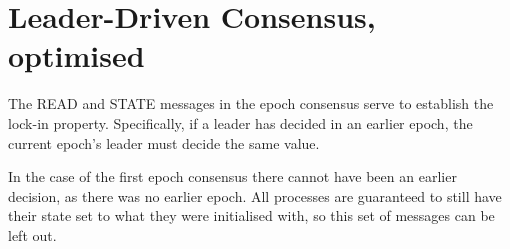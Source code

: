 \documentclass[a4paper]{scrreprt}
\begin{document}
\section{Leader-Driven Consensus, optimised}

The READ and STATE messages in the epoch consensus serve to establish the
lock-in property. Specifically, if a leader has decided in an earlier epoch, the
current epoch's leader must decide the same value.

In the case of the first epoch consensus there cannot have been an earlier
decision, as there was no earlier epoch. All processes are guaranteed to still
have their state set to what they were initialised with, so this set of
messages can be left out.
\end{document}
